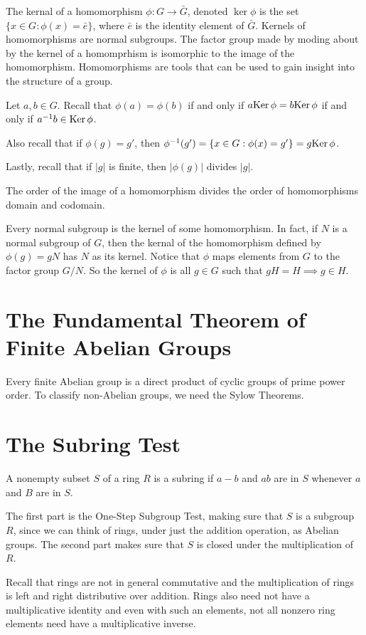 \documentclass{article}
\begin{document}
The kernal of a homomorphism $\phi:G\to\bar{G}$, denoted
$\ker\phi$ is the set $\{x\in G:\phi(x)=\bar{e}\}$, where
$\bar{e}$ is the identity element of $\bar{G}$.  Kernels
of homomorphisms are normal subgroups.  The factor group
made by moding about by the kernel of a homomprhism is
isomorphic to the image of the homomorphism.  Homomorphisms
are tools that can be used to gain insight into the structure
of a group.

Let $a,b\in G$.  Recall that $\phi(a)=\phi(b)$
if and only if $a\mbox{Ker}\,\phi=b\mbox{Ker}\,\phi$ if and only
if $a^{-1}b\in\mbox{Ker}\,\phi$.

Also recall that if $\phi(g)=g'$, then
$\phi^{-1}(g')=\{x\in G:\phi(x)=g'\}=g\mbox{Ker}\,\phi$.

Lastly, recall that if $|g|$ is finite, then
$|\phi(g)|$ divides $|g|$.

The order of the image of a homomorphism divides the
order of homomorphisms domain and codomain.

Every normal subgroup is the kernel of some homomorphism.
In fact, if $N$ is a normal subgroup of $G$, then the
kernal of the homomorphism defined by $\phi(g)=gN$
has $N$ as its kernel.  Notice that $\phi$ maps
elements from $G$ to the factor group $G/N$.
So the kernel of $\phi$ is all $g\in G$
such that $gH=H\implies g\in H$.

\section*{The Fundamental Theorem of Finite Abelian Groups}

Every finite Abelian group is a direct product of cyclic groups of
prime power order.  To classify non-Abelian groups, we need the
Sylow Theorems.

\section*{The Subring Test}

A nonempty subset $S$ of a ring $R$ is a subring if
$a-b$ and $ab$ are in $S$ whenever $a$ and $B$ are in $S$.

The first part is the One-Step Subgroup Test, making sure
that $S$ is a subgroup $R$, since we can think of rings,
under just the addition operation, as Abelian groups.
The second part makes sure that $S$ is closed under the
multiplication of $R$.

Recall that rings are not in general commutative and
the multiplication of rings is left and right
distributive over addition.  Rings also need not
have a multiplicative identity and even with such
an elements, not all nonzero ring elements
need have a multiplicative inverse.
\end{document}
